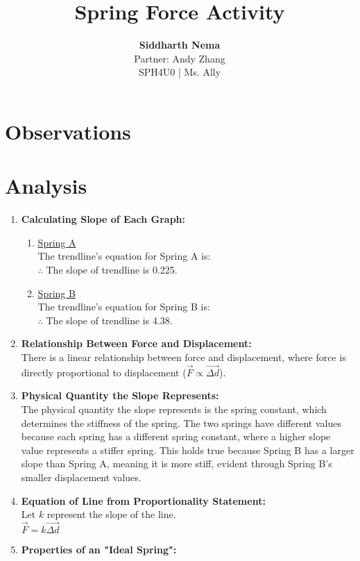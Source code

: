 \documentclass[12pt,letterpaper]{article}
\title{\textbf{Spring Force Activity}}
\author{\textbf{Siddharth Nema} \\Partner: Andy Zhang \\SPH4U0 | Ms.\hspace{-1mm} Ally}
\begin{document}
\maketitle
\newpage
\section{Observations}

\vspace{-8mm}
\section{Analysis}
\vspace{-4mm}



\newpage

\begin{enumerate}[font=\bfseries]
	\item \textbf{Calculating Slope of Each Graph:}
	      \vspace{-4mm}
	      \begin{enumerate}
		      \item \underline{Spring A}\\
		            The trendline's equation for Spring A is:~\\
		            $\therefore$ The slope of trendline is 0.225.
		      \item \underline{Spring B}\\
		            The trendline's equation for Spring B is:~\\
		            $\therefore$ The slope of trendline is 4.38.
	      \end{enumerate}
	\item \textbf{Relationship Between Force and Displacement:}\\
	      There is a linear relationship between force and displacement, where force is directly proportional to displacement ($\vec{F} \propto \vec{\Delta d}$).
	\item \textbf{Physical Quantity the Slope Represents:}\\
	      The physical quantity the slope represents is the spring constant, which determines the stiffness of the spring. The two springs have different values because each spring has a different spring constant, where a higher slope value represents a stiffer spring. This holds true because Spring B has a larger slope than Spring A, meaning it is more stiff, evident through Spring B's smaller displacement values.
	\item \textbf{Equation of Line from Proportionality Statement:}\\
	      Let $k$ represent the slope of the line.\\
	      $\vec{F} = k\vec{\Delta d}$
	\item \textbf{Properties of an "Ideal Spring":}
\end{enumerate}
\newpage

\end{document}
